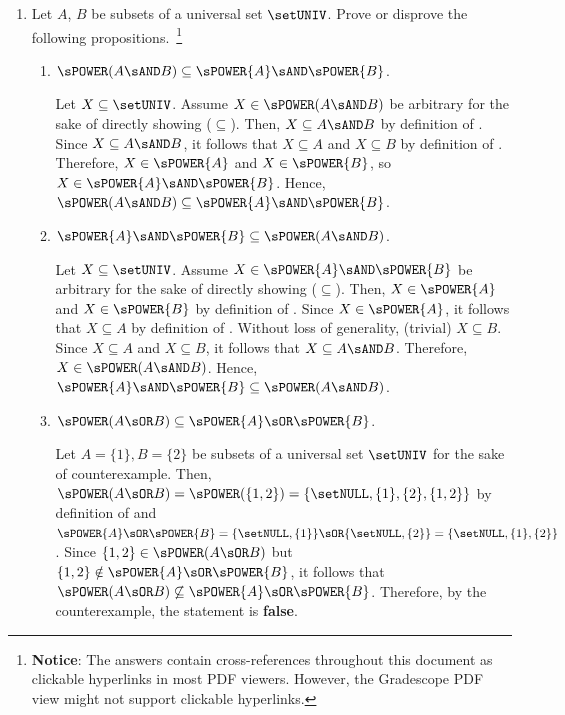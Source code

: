 \begin{enumerate}
  \newpage
  \item Let $A$, $B$ be subsets of a universal set $\setUNIV$. 
  Prove or disprove the following propositions.~\footnote{
    \textbf{Notice}: The answers contain cross-references throughout this document as clickable hyperlinks in most PDF viewers. 
    However, the Gradescope PDF view might not support clickable hyperlinks.
  }
  \begin{enumerate}
    \item $\sPOWER(A \sAND B) \subseteq \sPOWER{A} \sAND \sPOWER{B}$.
    \begin{subprove}
      Let $X \subseteq\setUNIV$. Assume $X\in\sPOWER(A \sAND B)$ be arbitrary for the sake of directly showing ($\subseteq$). 
      Then, $X \subseteq A \sAND B$ by definition of . 
      Since $X \subseteq A \sAND B$, it follows that 
      $X \subseteq A$ and $X \subseteq B$ by definition of . Therefore, $X \in \sPOWER{A}$ 
      and $X \in \sPOWER{B}$, so $X \in \sPOWER{A} \sAND \sPOWER{B}$.
      Hence, $\sPOWER(A \sAND B) \subseteq \sPOWER{A} \sAND \sPOWER{B}$.
    \end{subprove}
    
    \item $\sPOWER{A} \sAND \sPOWER{B} \subseteq \sPOWER(A \sAND B)$.
    \begin{subprove}
      Let $X \subseteq\setUNIV$. Assume $X\in\sPOWER{A} \sAND \sPOWER{B}$ be arbitrary for the sake of directly showing ($\subseteq$). 
      Then, $X \in \sPOWER{A}$ and $X \in \sPOWER{B}$ by definition of . 
      Since $X \in \sPOWER{A}$, it follows that $X \subseteq A$ by definition of . 
      Without loss of generality, (trivial) $X \subseteq B$.
      Since $X \subseteq A$ and $X \subseteq B$, it follows that $X \subseteq A \sAND B$.
      Therefore, $X \in \sPOWER(A \sAND B)$.
      Hence, $\sPOWER{A} \sAND \sPOWER{B} \subseteq \sPOWER(A \sAND B)$.
    \end{subprove}

    \item $\sPOWER(A \sOR B) \subseteq \sPOWER{A} \sOR \sPOWER{B}$.
    \begin{subdisprove}
      Let $A=\{1\}, B=\{2\}$ be subsets of a universal set $\setUNIV$ 
      for the sake of counterexample. 
      Then, $\sPOWER(A \sOR B)=\sPOWER(\{1,2\})=\{\setNULL,\{1\},\{2\},\{1,2\}\}$ by definition of 
      and $\sPOWER{A} \sOR \sPOWER{B}=\{\setNULL,\{1\}\} \sOR \{\setNULL,\{2\}\}=\{\setNULL,\{1\},\{2\}\}$. 
      Since $\{1,2\} \in \sPOWER(A \sOR B)$ but $\{1,2\} \notin \sPOWER{A} \sOR \sPOWER{B}$, 
      it follows that $\sPOWER(A \sOR B) \not\subseteq \sPOWER{A} \sOR \sPOWER{B}$. 
      Therefore, by the counterexample, the statement is \textbf{false}.
    \end{subdisprove}


\end{enumerate}
\end{enumerate}
